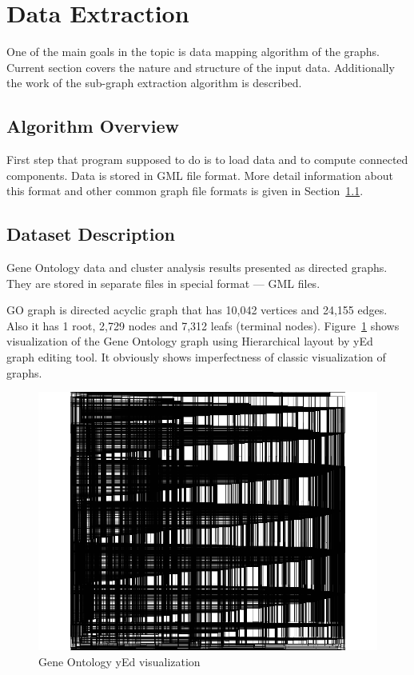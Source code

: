\newpage
\section{Data Extraction}

One of the main goals in the topic is data mapping algorithm of the graphs.
Current section covers the nature and structure of the input data.
Additionally the work of the sub-graph extraction algorithm is described.

\subsection{Algorithm Overview}
\label{sec:algorithm}

First step that program supposed to do is to load data and to compute connected components.
Data is stored in GML file format.
More detail information about this format and other common graph file formats is given in Section~\ref{sec:algorithm}.

\subsection{Dataset Description}
\label{sec:dataset_description}
Gene Ontology data and cluster analysis results presented as directed graphs.
They are stored in separate files in special format --- GML files.


GO graph is directed acyclic graph that has 10,042 vertices and  24,155 edges.
Also it has 1 root, 2,729 nodes and 7,312 leafs (terminal nodes).
Figure~\ref{fig:yed_GO_vis} shows visualization of the Gene Ontology graph using Hierarchical layout by yEd~\cite{yed} graph editing tool.
It obviously shows imperfectness of classic visualization of graphs.


\begin{figure}[h!]
\centering
\includegraphics[scale=0.3]{pictures/yEd_GO.png}
\caption{Gene Ontology yEd visualization}
\label{fig:yed_GO_vis}
\end{figure}


